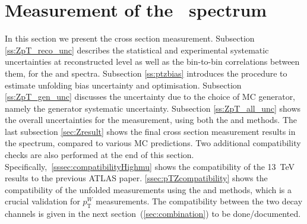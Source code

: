 \section{Measurement of the \ptz\ spectrum\label{sec:ptwuncert}}
\label{sec:Zptmeasurement}

In this section we present the \pTZ cross section measurement. Subsection \ref{ss:ZpT_reco_unc} describes the statistical and experimental systematic uncertainties at reconstructed level as well as the bin-to-bin correlations between them, for the \ptdilep and \ut spectra. Subsection \ref{ss:ptzbias} introduces the procedure to estimate unfolding bias uncertainty and optimisation. Subsection \ref{ss:ZpT_gen_unc} discusses the uncertainty due to the choice of MC generator, namely the generator systematic uncertainty. Subsection \ref{ss:ZpT_all_unc} shows the overall uncertainties for the \pTZ measurement, using both the \ptdilep and \ut methods. The last subsection \ref{sec:Zresult} shows the final cross section measurement results in the \pTZ spectrum, compared to various MC predictions. Two additional compatibility checks are also performed at the end of this section. Specifically,~\ref{sssec:compatibilityHighmu} shows the compatibility of the 13~TeV results to the previous ATLAS \pTZ paper.
\ref{ssec:pTZcompatibility} shows the compatibility of the unfolded \pTZ measurements using the \ptdilep and \ut methods, which is a crucial validation for $p_{\mathrm{T}}^{W}$ measurements. The compatibility between the two decay channels is given in the next section~(\ref{sec:combination}) {\color{red} to be done/documented}.


